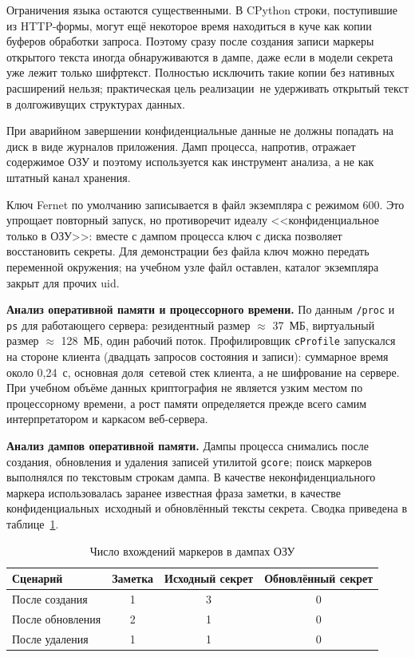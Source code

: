 Ограничения языка остаются существенными. В CPython строки, поступившие из HTTP-формы, могут ещё некоторое время находиться в куче как копии буферов обработки запроса. Поэтому сразу после создания записи маркеры открытого текста иногда обнаруживаются в дампе, даже если в модели секрета уже лежит только шифртекст. Полностью исключить такие копии без нативных расширений нельзя; практическая цель реализации~\mdash  не удерживать открытый текст в долгоживущих структурах данных.

При аварийном завершении конфиденциальные данные не должны попадать на диск в виде журналов приложения. Дамп процесса, напротив, отражает содержимое ОЗУ и поэтому используется как инструмент анализа, а не как штатный канал хранения.

Ключ Fernet по умолчанию записывается в файл экземпляра с режимом 600. Это упрощает повторный запуск, но противоречит идеалу <<конфиденциальное только в ОЗУ>>: вместе с дампом процесса ключ с диска позволяет восстановить секреты. Для демонстрации без файла ключ можно передать переменной окружения; на учебном узле файл оставлен, каталог экземпляра закрыт для прочих uid.

\textbf{Анализ оперативной памяти и процессорного времени.}
По данным \texttt{/proc} и \texttt{ps} для работающего сервера: резидентный размер $\approx$ 37~МБ, виртуальный размер $\approx$ 128~МБ, один рабочий поток. Профилировщик \texttt{cProfile} запускался на стороне клиента (двадцать запросов состояния и записи): суммарное время около 0,24~с, основная доля~\mdash  сетевой стек клиента, а не шифрование на сервере. При учебном объёме данных криптография не является узким местом по процессорному времени, а рост памяти определяется прежде всего самим интерпретатором и каркасом веб-сервера.

\pagebreak
\textbf{Анализ дампов оперативной памяти.}
Дампы процесса снимались после создания, обновления и удаления записей утилитой \texttt{gcore}; поиск маркеров выполнялся по текстовым строкам дампа. В качестве неконфиденциального маркера использовалась заранее известная фраза заметки, в качестве конфиденциальных~\mdash  исходный и обновлённый тексты секрета. Сводка приведена в таблице~\ref{tab:dumps}.

\begin{table}[ht]
	\begin{tabularx}{\textwidth}{|l|c|c|c|}
		\hline
		\textbf{Сценарий} & Заметка & Исходный секрет & Обновлённый секрет \\
		\hline
		После создания & 1 & 3 & 0 \\
		\hline
		После обновления & 2 & 1 & 0 \\
		\hline
		После удаления & 1 & 1 & 0 \\
		\hline
	\end{tabularx}
	\caption{Число вхождений маркеров в дампах ОЗУ}
	\label{tab:dumps}
\end{table}

